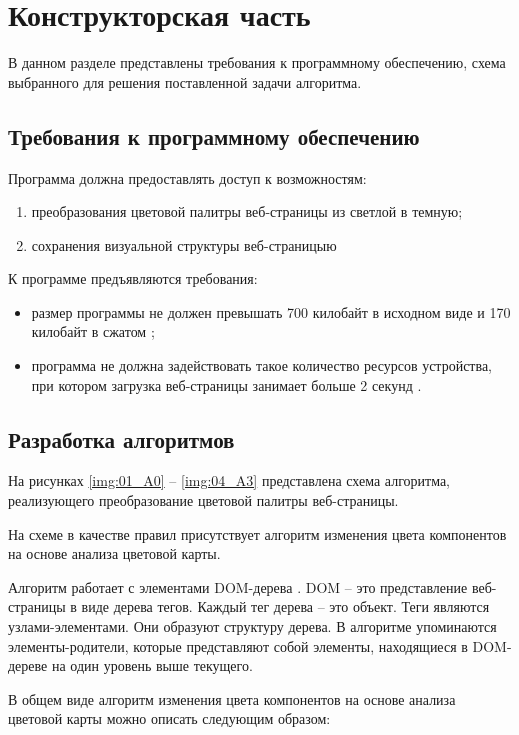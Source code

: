 \chapter{Конструкторская часть}

В данном разделе представлены требования к программному обеспечению, схема выбранного для решения поставленной задачи алгоритма.

\section{Требования к программному обеспечению}

Программа должна предоставлять доступ к возможностям:
\begin{enumerate}[label={\arabic*)}]
	\item преобразования цветовой палитры веб-страницы из светлой в темную;
	\item сохранения визуальной структуры веб-страницыю
\end{enumerate}

К программе предъявляются требования:
\begin{itemize}
	\item размер программы не должен превышать 700 килобайт в исходном виде и 170 килобайт в сжатом \cite{jscost};
	\item программа не должна задействовать такое количество ресурсов устройства, при котором загрузка веб-страницы занимает больше 2 секунд \cite{siteload}.
\end{itemize}

\section{Разработка алгоритмов}

На рисунках \ref{img:01_A0} -- \ref{img:04_A3} представлена схема алгоритма, реализующего преобразование цветовой палитры веб-страницы.

На схеме в качестве правил присутствует алгоритм изменения цвета компонентов на основе анализа цветовой карты.

Алгоритм работает с элементами DOM-дерева \cite{dom}. DOM -- это представление веб-страницы в виде дерева тегов. Каждый тег дерева -- это объект. Теги являются узлами-элементами. Они образуют структуру дерева. В алгоритме упоминаются элементы-родители, которые представляют собой элементы, находящиеся в DOM-дереве на один уровень выше текущего.

В общем виде алгоритм изменения цвета компонентов на основе анализа цветовой карты можно описать следующим образом:

